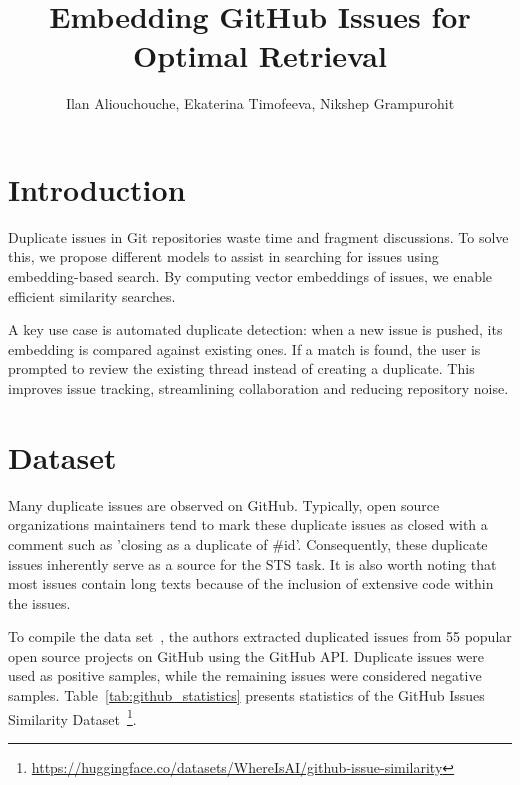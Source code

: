 \documentclass[
	a4paper, %
	10pt, %
	unnumberedsections, %
	twoside, %
]{LTJournalArticle}
\title{Embedding GitHub Issues for Optimal Retrieval} %
\author{%
	Ilan Aliouchouche, Ekaterina Timofeeva, Nikshep Grampurohit
}
\begin{document}
\maketitle %


\section{Introduction}

Duplicate issues in Git repositories waste time and fragment discussions. To solve this, we propose different models to assist in searching for issues using embedding-based search. By computing vector embeddings of issues, we enable efficient similarity searches.

A key use case is automated duplicate detection: when a new issue is pushed, its embedding is compared against existing ones. If a match is found, the user is prompted to review the existing thread instead of creating a duplicate. This improves issue tracking, streamlining collaboration and reducing repository noise.

 



\section{Dataset}
Many duplicate issues are observed on GitHub. Typically, open source organizations maintainers tend to mark these duplicate issues as closed with a comment such as 'closing as a duplicate of \#id'. Consequently, these duplicate issues inherently serve as a source for the STS task. It is also worth noting that most issues contain long texts because of the inclusion of extensive code within the issues. 

To compile the data set~\autocite{li-li-2024-aoe}, the authors extracted duplicated issues from 55 popular open source projects on GitHub using the GitHub API. Duplicate issues were used as positive samples, while the remaining issues were considered negative samples. Table~\ref{tab:github_statistics} presents statistics of the GitHub Issues Similarity Dataset~\footnote{\url{https://huggingface.co/datasets/WhereIsAI/github-issue-similarity}}.
\end{document}

